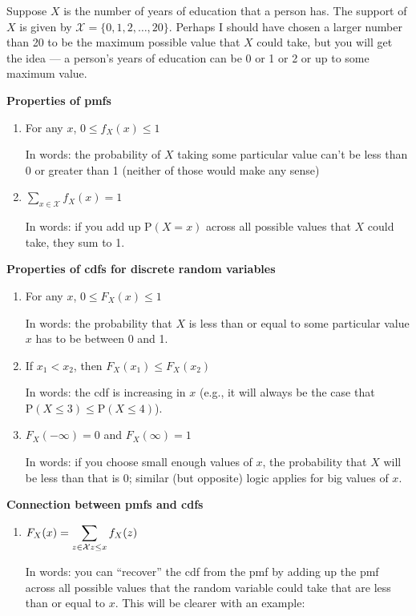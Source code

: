\documentclass[
  letterpaper,
  DIV=11,
  numbers=noendperiod]{scrreprt}
\begin{document}
Suppose \(X\) is the number of years of education that a person has. The
support of \(X\) is given by \(\mathcal{X} = \{0, 1, 2, \ldots, 20\}\).
Perhaps I should have chosen a larger number than 20 to be the maximum
possible value that \(X\) could take, but you will get the idea --- a
person's years of education can be 0 or 1 or 2 or up to some maximum
value.

\textbf{Properties of pmfs}

\begin{enumerate}
\def\labelenumi{\arabic{enumi}.}
\item
  For any \(x\), \(0 \leq f_X(x) \leq 1\)

  In words: the probability of \(X\) taking some particular value can't
  be less than 0 or greater than 1 (neither of those would make any
  sense)
\item
  \(\sum_{x \in \mathcal{X}} f_X(x) = 1\)

  In words: if you add up \(\mathrm{P}(X=x)\) across all possible values
  that \(X\) could take, they sum to 1.
\end{enumerate}

\textbf{Properties of cdfs for discrete random variables}

\begin{enumerate}
\def\labelenumi{\arabic{enumi}.}
\item
  For any \(x\), \(0 \leq F_X(x) \leq 1\)

  In words: the probability that \(X\) is less than or equal to some
  particular value \(x\) has to be between 0 and 1.
\item
  If \(x_1 < x_2\), then \(F_X(x_1) \leq F_X(x_2)\)

  In words: the cdf is increasing in \(x\) (e.g., it will always be the
  case that \(\mathrm{P}(X \leq 3) \leq \mathrm{P}(X \leq 4)\)).
\item
  \(F_X(-\infty)=0\) and \(F_X(\infty)=1\)

  In words: if you choose small enough values of \(x\), the probability
  that \(X\) will be less than that is 0; similar (but opposite) logic
  applies for big values of \(x\).
\end{enumerate}

\textbf{Connection between pmfs and cdfs}

\begin{enumerate}
\def\labelenumi{\arabic{enumi}.}
\item
  \(F_X(x) = \displaystyle \sum_{z \in \mathcal{X} \\ z \leq x} f_X(z)\)

  In words: you can ``recover'' the cdf from the pmf by adding up the
  pmf across all possible values that the random variable could take
  that are less than or equal to \(x\). This will be clearer with an
  example:
\end{enumerate}
\end{document}
